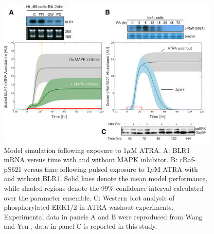 \documentclass[12pt]{article}
\begin{document}
\begin{figure}[!t]\centering
\includegraphics[width=1.0\textwidth]{./figs/Fig-3-Predictions.pdf}
\caption{Model simulation following exposure to 1$\mu$M ATRA.
A: BLR1 mRNA versus time with and without MAPK inhibitor.
B: cRaf-pS621 versus time following pulsed exposure to 1$\mu$M ATRA with and without BLR1.
Solid lines denote the mean model performance, while shaded regions denote the 99\% confidence interval calculated over the parameter ensemble.
C: Western blot analysis of phosphorylated ERK1/2 in ATRA washout experiments.
Experimental data in panels A and B were reproduced from Wang and Yen \cite{Wang2008}, data in panel C is reported in this study. }\label{fig:model-predictions}
\end{figure}
\end{document}
